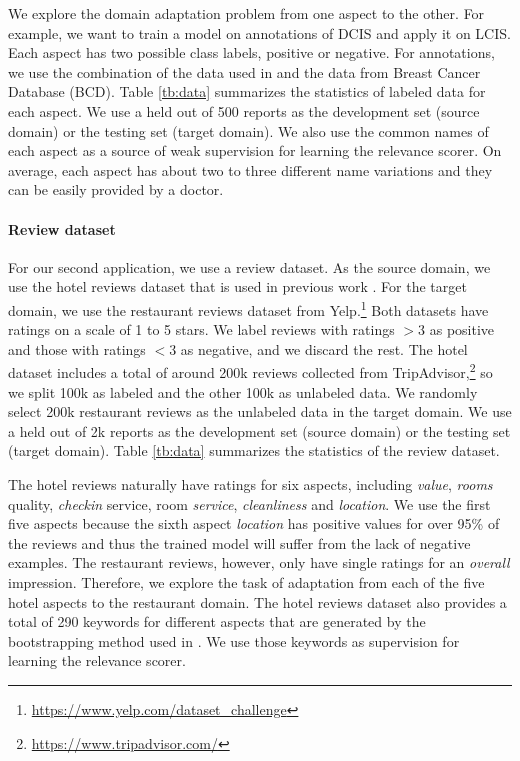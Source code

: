 We explore the domain adaptation problem from one aspect to the other. For example, we want to train a model on annotations of DCIS and apply it on LCIS. Each aspect has two possible class labels, positive or negative. For annotations, we use the combination of the data used in \cite{buckley2012feasibility} and the data from Breast Cancer Database (BCD). Table \ref{tb:data} summarizes the statistics of labeled data for each aspect. We use a held out of 500 reports as the development set (source domain) or the testing set (target domain). We also use the common names of each aspect as a source of weak supervision for learning the relevance scorer. On average, each aspect has about two to three different name variations and they can be easily provided by a doctor. 


\paragraph{Review dataset}
For our second application, we use a review dataset. As the source domain, we use the hotel reviews dataset that is used in previous work \cite{wang2010latent,wang2011latent}. For the target domain, we use the restaurant reviews dataset from Yelp.\footnote{\url{https://www.yelp.com/dataset_challenge}} Both datasets have ratings on a scale of 1 to 5 stars. We label reviews with ratings $>3$ as positive and those with ratings $<3$ as negative, and we discard the rest. The hotel dataset includes a total of around 200k reviews collected from TripAdvisor,\footnote{\url{https://www.tripadvisor.com/}} so we split 100k as labeled and the other 100k as unlabeled data. We randomly select 200k restaurant reviews as the unlabeled data in the target domain. We use a held out of 2k reports as the development set (source domain) or the testing set (target domain). Table \ref{tb:data} summarizes the statistics of the review dataset.

The hotel reviews naturally have ratings for six aspects, including \emph{value}, \emph{rooms} quality, \emph{checkin} service, room \emph{service}, \emph{cleanliness} and \emph{location}. We use the first five aspects because the sixth aspect \emph{location} has positive values for over 95\% of the reviews and thus the trained model will suffer from the lack of negative examples. The restaurant reviews, however, only have single ratings for an \emph{overall} impression. Therefore, we explore the task of adaptation  from each of the five hotel aspects to the restaurant domain. The hotel reviews dataset also provides a total of 290 keywords for different aspects that are generated by the bootstrapping method used in \cite{wang2010latent}. We use those keywords as supervision for learning the relevance scorer.

